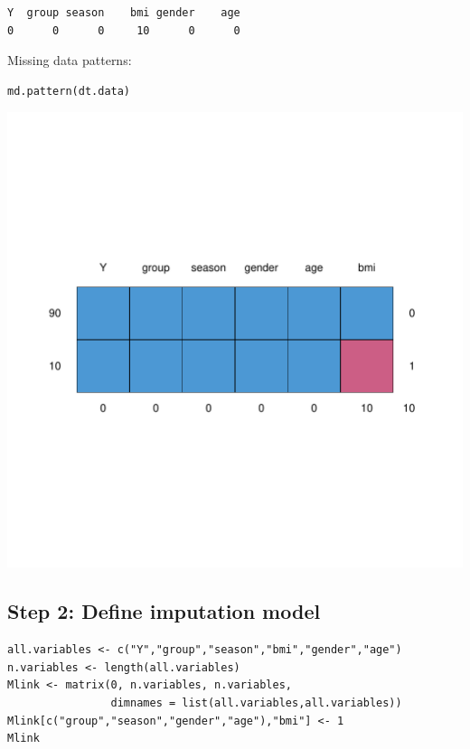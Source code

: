 \documentclass[12pt]{article}
\begin{document}
\begin{verbatim}
Y  group season    bmi gender    age 
0      0      0     10      0      0
\end{verbatim}

Missing data patterns:   
\lstset{language=r,label= ,caption= ,captionpos=b,numbers=none}
\begin{lstlisting}
md.pattern(dt.data)
\end{lstlisting}

\begin{center}
\includegraphics[width=.9\linewidth]{./missingDataPattern.pdf}
\end{center}

\clearpage

\subsection{Step 2: Define imputation model}
\label{sec:org3ca7387}

\lstset{language=r,label= ,caption= ,captionpos=b,numbers=none}
\begin{lstlisting}
all.variables <- c("Y","group","season","bmi","gender","age")
n.variables <- length(all.variables)
Mlink <- matrix(0, n.variables, n.variables,
				dimnames = list(all.variables,all.variables))
Mlink[c("group","season","gender","age"),"bmi"] <- 1
Mlink
\end{lstlisting}
\end{document}
